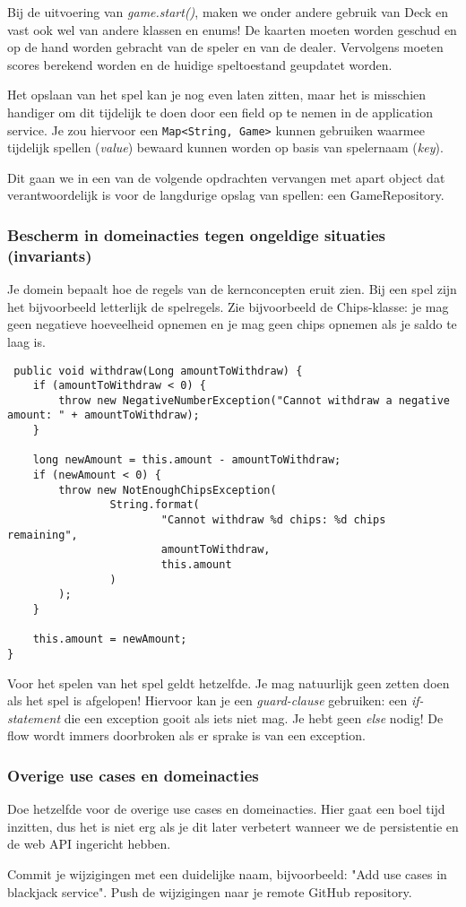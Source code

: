 Bij de uitvoering van \textit{game.start()}, maken we onder andere gebruik van 
Deck en vast ook wel van andere klassen en enums! 
De kaarten moeten worden geschud en op de hand worden gebracht van de speler 
en van de dealer. Vervolgens moeten scores berekend worden en de huidige speltoestand 
geupdatet worden.

Het opslaan van het spel kan je nog even laten zitten,
maar het is misschien handiger om dit tijdelijk te doen 
door een field op te nemen in de application service.
Je zou hiervoor een \texttt{Map<String, Game>} kunnen gebruiken 
waarmee tijdelijk spellen (\textit{value}) bewaard kunnen worden 
op basis van spelernaam (\textit{key}).

Dit gaan we in een van de volgende opdrachten vervangen met apart object dat verantwoordelijk 
is voor de langdurige opslag van spellen: een GameRepository.

\subsubsection{Bescherm in domeinacties tegen ongeldige situaties (invariants)}
Je domein bepaalt hoe de regels van de kernconcepten eruit zien.
Bij een spel zijn het bijvoorbeeld letterlijk de spelregels.
Zie bijvoorbeeld de Chips-klasse: je mag geen negatieve hoeveelheid opnemen 
en je mag geen chips opnemen als je saldo te laag is.

\begin{verbatim}
 public void withdraw(Long amountToWithdraw) {
    if (amountToWithdraw < 0) {
        throw new NegativeNumberException("Cannot withdraw a negative amount: " + amountToWithdraw);
    }

    long newAmount = this.amount - amountToWithdraw;
    if (newAmount < 0) {
        throw new NotEnoughChipsException(
                String.format(
                        "Cannot withdraw %d chips: %d chips remaining",
                        amountToWithdraw,
                        this.amount
                )
        );
    }

    this.amount = newAmount;
}    
\end{verbatim}

Voor het spelen van het spel geldt hetzelfde. Je mag natuurlijk 
geen zetten doen als het spel is afgelopen! Hiervoor kan je een \textit{guard-clause} gebruiken:
een \textit{if-statement} die een exception gooit als iets niet mag. Je hebt geen \textit{else} nodig! 
De flow wordt immers doorbroken als er sprake is van een exception.

\subsubsection{Overige use cases en domeinacties}
Doe hetzelfde voor de overige use cases en domeinacties. 
Hier gaat een boel tijd inzitten, 
dus het is niet erg als je dit later verbetert wanneer we 
de persistentie en de web API ingericht hebben.

Commit je wijzigingen met een duidelijke naam, 
bijvoorbeeld: "Add use cases in blackjack service". 
Push de wijzigingen naar je remote GitHub repository.